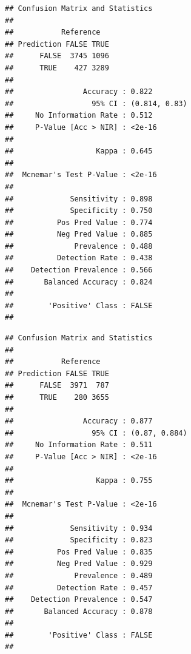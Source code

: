 \documentclass[
]{article}
\newenvironment{Shaded}{\begin{snugshade}}{\end{snugshade}}
\newcommand{\CommentTok}[1]{\textcolor[rgb]{0.56,0.35,0.01}{\textit{#1}}}
\newcommand{\FunctionTok}[1]{\textcolor[rgb]{0.00,0.00,0.00}{#1}}
\newcommand{\NormalTok}[1]{#1}
\newcommand{\SpecialCharTok}[1]{\textcolor[rgb]{0.00,0.00,0.00}{#1}}
\begin{document}
\begin{verbatim}
## Confusion Matrix and Statistics
## 
##           Reference
## Prediction FALSE TRUE
##      FALSE  3745 1096
##      TRUE    427 3289
##                                        
##                Accuracy : 0.822        
##                  95% CI : (0.814, 0.83)
##     No Information Rate : 0.512        
##     P-Value [Acc > NIR] : <2e-16       
##                                        
##                   Kappa : 0.645        
##                                        
##  Mcnemar's Test P-Value : <2e-16       
##                                        
##             Sensitivity : 0.898        
##             Specificity : 0.750        
##          Pos Pred Value : 0.774        
##          Neg Pred Value : 0.885        
##              Prevalence : 0.488        
##          Detection Rate : 0.438        
##    Detection Prevalence : 0.566        
##       Balanced Accuracy : 0.824        
##                                        
##        'Positive' Class : FALSE        
## 
\end{verbatim}

\begin{Shaded}
\end{Shaded}

\begin{verbatim}
## Confusion Matrix and Statistics
## 
##           Reference
## Prediction FALSE TRUE
##      FALSE  3971  787
##      TRUE    280 3655
##                                        
##                Accuracy : 0.877        
##                  95% CI : (0.87, 0.884)
##     No Information Rate : 0.511        
##     P-Value [Acc > NIR] : <2e-16       
##                                        
##                   Kappa : 0.755        
##                                        
##  Mcnemar's Test P-Value : <2e-16       
##                                        
##             Sensitivity : 0.934        
##             Specificity : 0.823        
##          Pos Pred Value : 0.835        
##          Neg Pred Value : 0.929        
##              Prevalence : 0.489        
##          Detection Rate : 0.457        
##    Detection Prevalence : 0.547        
##       Balanced Accuracy : 0.878        
##                                        
##        'Positive' Class : FALSE        
## 
\end{verbatim}
\end{document}
